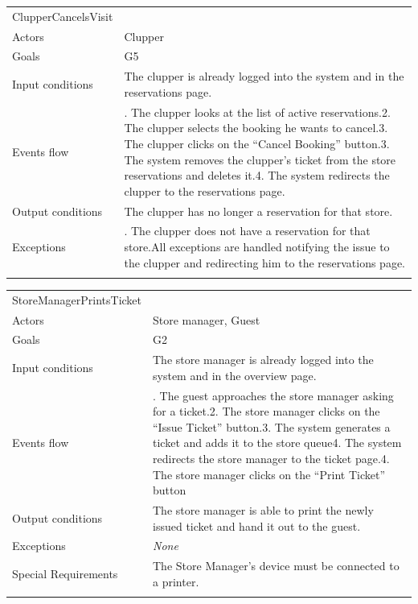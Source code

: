 \documentclass[
]{article}
\begin{document}
\begin{longtable}[]{@{}
  >{\raggedright\arraybackslash}p{}
  >{\raggedright\arraybackslash}p{}@{}}
\toprule
ClupperCancelsVisit & \\ \addlinespace
\midrule
\endhead
Actors & Clupper \\ \addlinespace
Goals & G5 \\ \addlinespace
Input conditions & The clupper is already logged into the system and in
the reservations page. \\ \addlinespace
Events flow & 1. The clupper looks at the list of active reservations.2.
The clupper selects the booking he wants to cancel.3. The clupper clicks
on the ``Cancel Booking'' button.3. The system removes the clupper's
ticket from the store reservations and deletes it.4. The system
redirects the clupper to the reservations page. \\ \addlinespace
Output conditions & The clupper has no longer a reservation for that
store. \\ \addlinespace
Exceptions & 1. The clupper does not have a reservation for that
store.All exceptions are handled notifying the issue to the clupper and
redirecting him to the reservations page. \\ \addlinespace
\bottomrule
\end{longtable}

\begin{longtable}[]{@{}
  >{\raggedright\arraybackslash}p{}
  >{\raggedright\arraybackslash}p{}@{}}
\toprule
StoreManagerPrintsTicket & \\ \addlinespace
\midrule
\endhead
Actors & Store manager, Guest \\ \addlinespace
Goals & G2 \\ \addlinespace
Input conditions & The store manager is already logged into the system
and in the overview page. \\ \addlinespace
Events flow & 1. The guest approaches the store manager asking for a
ticket.2. The store manager clicks on the ``Issue Ticket'' button.3. The
system generates a ticket and adds it to the store queue4. The system
redirects the store manager to the ticket page.4. The store manager
clicks on the ``Print Ticket'' button \\ \addlinespace
Output conditions & The store manager is able to print the newly issued
ticket and hand it out to the guest. \\ \addlinespace
Exceptions & \emph{None} \\ \addlinespace
Special Requirements & The Store Manager's device must be connected to a
printer. \\ \addlinespace
\bottomrule
\end{longtable}
\end{document}
